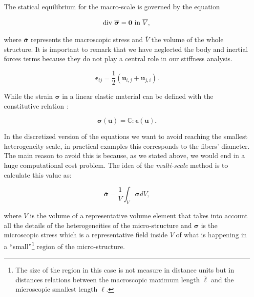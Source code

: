 \documentclass[review]{elsarticle}
\begin{document}
The statical equilibrium for the macro-scale is governed by the equation

\begin{equation}
\text{div } \overline{\bm{\sigma}} = \bm{0} \text{ in } \overline{V},\\
\label{eq:macro_equil}
\end{equation}

\noindent
where $\overline{\bm{\sigma}}$ represents the macroscopic stress and
$\overline{V}$ the volume of the whole structure. It is important to remark that
we have neglected the body and inertial forces terms because they do not
play a central role in our stiffness analysis.

\begin{equation}
 \bm{\epsilon}_{ij} = \frac{1}{2}\left( \bm{u}_{i,j} + \bm{u}_{j,i} \right).
\label{eq:constitutive}
\end{equation}

While the strain $\bm{\sigma}$ in a linear elastic material can be defined with the 
constitutive relation :

\begin{equation}
\bm{\sigma}(\bm{u}) = \mathbb{C} : \bm{\epsilon}(\bm{u}).
\label{eq:constitutive}
\end{equation}

In the discretized version of the equations we want to avoid reaching 
the smallest heterogeneity scale, in practical examples this corresponds 
to the fibers' diameter. The main reason to avoid this is because, as we 
stated above, we would end in a huge computational cost problem.
The idea of the \emph{multi-scale} method is to calculate this value
as:

\begin{equation}
\overline{\bm{\sigma}} = \frac{1}{V} \int_{V} \bm{\sigma} dV,
\label{stress_ave}
\end{equation}

\noindent
where $V$ is the volume of a
representative volume element that takes into account all the details of the
heterogeneities of the micro-structure and $\bm{\sigma}$ is the microscopic
stress which is a representative field inside $V$ of what is happening in a
``small''\footnote{The size of the region in this case is not measure in
distance units but in distances relations between the macroscopic maximum length
$\overline{\ell}$ and the microscopic smallest length $\ell$.} region of the micro-structure.
\end{document}

